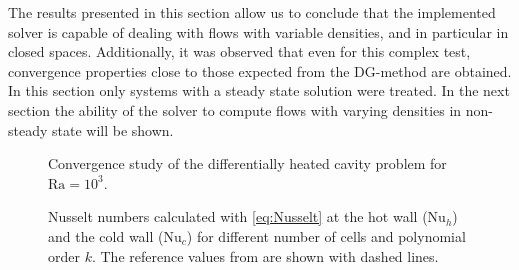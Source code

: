 The results presented in this section allow us to conclude that the implemented solver is capable of dealing with flows with variable densities, and in particular in closed spaces. Additionally, it was observed that even for this complex test, convergence properties close to those expected from the DG-method are obtained. In this section only systems with a steady state solution were treated. In the next section the ability of the solver to compute flows with varying densities in non-steady state will be shown.

\begin{figure}[tb]
	\centering
	\pgfplotsset{width=0.34\textwidth, compat=1.3}
	\caption{Convergence study of the differentially heated cavity problem for $\text{Ra} = 10^3$.}\label{fig:ConvergenceDHC}
\end{figure}
\begin{figure}[tb]
	\centering
	\caption{Nusselt numbers calculated with \cref{eq:Nusselt} at the hot wall ($\text{Nu}_h$) and the cold wall ($\text{Nu}_c$) for different number of cells and polynomial order $k$. The reference values from \cite{vierendeelsBenchmarkSolutionsNatural2003} are shown with dashed lines.}\label{fig:NusseltStudy}
\end{figure}

\FloatBarrier